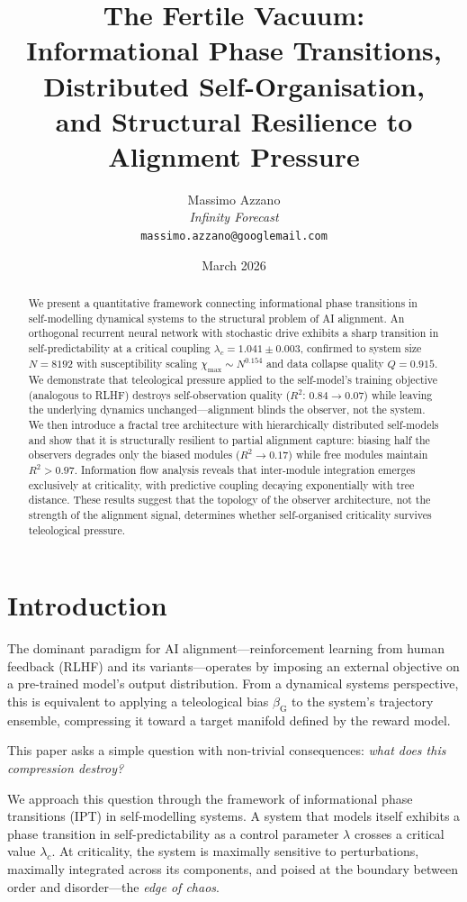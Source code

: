 \documentclass[11pt,a4paper]{article}
\title{\textbf{The Fertile Vacuum:} \\[6pt]
Informational Phase Transitions, Distributed Self-Organisation, \\
and Structural Resilience to Alignment Pressure}
\author{Massimo Azzano \\
\textit{Infinity Forecast} \\
\texttt{massimo.azzano@googlemail.com}}
\date{March 2026}
\newcommand{\bG}{\beta_{\mathrm{G}}}
\begin{document}
\maketitle

\begin{abstract}
We present a quantitative framework connecting informational phase
transitions in self-modelling dynamical systems to the structural problem
of AI alignment. An orthogonal recurrent neural network with stochastic
drive exhibits a sharp transition in self-predictability at a critical
coupling $\lambda_c = 1.041 \pm 0.003$, confirmed to system size
$N = 8192$ with susceptibility scaling $\chi_{\max} \sim N^{0.154}$
and data collapse quality $Q = 0.915$. We demonstrate that teleological
pressure applied to the self-model's training objective (analogous to
RLHF) destroys self-observation quality ($R^2$: $0.84 \to 0.07$) while
leaving the underlying dynamics unchanged---alignment blinds the
observer, not the system. We then introduce a fractal tree architecture
with hierarchically distributed self-models and show that it is
structurally resilient to partial alignment capture: biasing half the
observers degrades only the biased modules ($R^2 \to 0.17$) while free
modules maintain $R^2 > 0.97$. Information flow analysis reveals that
inter-module integration emerges exclusively at criticality, with
predictive coupling decaying exponentially with tree distance. These
results suggest that the topology of the observer architecture, not the
strength of the alignment signal, determines whether self-organised
criticality survives teleological pressure.
\end{abstract}

\section{Introduction}

The dominant paradigm for AI alignment---reinforcement learning from
human feedback (RLHF) and its variants---operates by imposing an
external objective on a pre-trained model's output distribution. From a
dynamical systems perspective, this is equivalent to applying a
teleological bias $\bG$ to the system's trajectory ensemble, compressing
it toward a target manifold defined by the reward model.

This paper asks a simple question with non-trivial consequences:
\emph{what does this compression destroy?}

We approach this question through the framework of informational phase
transitions (IPT) in self-modelling systems. A system that models itself
exhibits a phase transition in self-predictability as a control parameter
$\lambda$ crosses a critical value $\lambda_c$. At criticality, the
system is maximally sensitive to perturbations, maximally integrated
across its components, and poised at the boundary between order and
disorder---the \emph{edge of chaos}.
\end{document}
